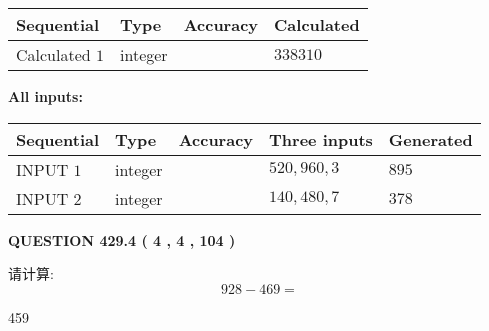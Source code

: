 \documentclass{ctexart}
\begin{document}
   
   
   
\noindent{}
   
   
  
  
\noindent\begin{tabular}{|l|l|l|l|}
\hline
 Sequential & Type & Accuracy & Calculated \\ 
\hline
 
 
  Calculated $  1 $ & integer &  & 
  $ 338310 $ 
 \\  \hline  
 \end{tabular}
   
   
   
   
\noindent\vspace{0.1in}\hspace{-0.08in} {\textbf{\Large{All inputs: }}}
   
   
  
  
\noindent\begin{tabular}{|l|l|l|l|l|}
\hline
 Sequential & Type & Accuracy & Three inputs & Generated \\ 
\hline
 
 
  INPUT $  1 $ & integer &  & $
 520
 , 
 960
 , 
 3
 $ & $ 895 $ 
 \\  \hline  
 
 
  INPUT $  2 $ & integer &  & $
 140
 , 
 480
 , 
 7
 $ & $ 378 $ 
 \\  \hline  
 \end{tabular}
   
   
  
\vspace{0.2in}
  
{\textbf{\Large{QUESTION
429.4 
 ( 4 , 4 , 104 )
}}}
  
  
 
请计算:
\begin{equation}
928 -   %
469 = \nonumber
\end{equation}
 
 
 
\noindent{}
 
 

459
 
 
\noindent{}
 
 

 
 
 
\noindent{}
 
\end{document}
